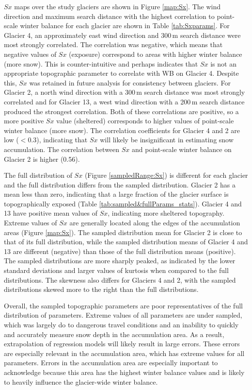 \documentclass{sfuthesis}
\begin{document}
$Sx$ maps over the study glaciers are shown in Figure \ref{map:Sx}. The wind direction and maximum search distance with the highest correlation to point-scale winter balance for each glacier are shown in Table \ref{tab:Sxparams}. For Glacier 4, an approximately east wind direction and 300\,m search distance were most strongly correlated. The correlation was negative, which means that negative values of $Sx$ (exposure) correspond to areas with higher winter balance (more snow). This is counter-intuitive and perhaps indicates that $Sx$ is not an appropriate topographic parameter to correlate with WB on Glacier 4. Despite this, $Sx$ was retained in future analysis for consistency between glaciers. For Glacier 2, a north wind direction with a 300\,m search distance was most strongly correlated and for Glacier 13, a west wind direction with a 200\,m search distance produced the strongest correlation. Both of these correlations are positive, so a more positive $Sx$ value (sheltered) corresponds to higher values of point-scale winter balance (more snow). The correlation coefficients for Glacier 4 and 2 are low ($<$0.3), indicating that $Sx$ will likely be insignificant in estimating snow accumulation. The correlation between $Sx$ and point-scale winter balance on Glacier 2 is higher (0.56). 

The full distribution of $Sx$ (Figure \ref{sampledRange:Sx}) is different for each glacier and the full distribution differs from the sampled distribution. Glacier 2 has a mean less than zero, indicating that a large fraction of the glacier surface is topographically exposed (Table \ref{tab:sampled&fullParams_stats}). Glacier 4 and 13 have positive mean values of $Sx$, indicating more sheltered topography. Extreme values of $Sx$ are generally located along the edges of the accumulation areas (Figure \ref{map:Sx}). The sampled distribution mean for Glacier 2 is close to that of its full distribution, while the sampled distribution means of Glacier 4 and 13 are different (negative) than those of the full distribution means (positive). The sampled distributions are more sharply peaked, as indicated by the lower standard deviations and larger values of kurtosis when compared to the full distributions. The skewness also differs for Glaciers 4 and 2, with the sampled distributions skewed more to the right than the full distributions. 

Overall, the sampled topographic parameters are poor representatives of the full distribution of parameters. Extreme values of all parameters are under sampled, which was largely do to dangerous travel conditions and an inability to quickly and accurately measure snow depth in the accumulation area. As a result, extrapolation of regression models will likely result in large errors. These errors are especially relevant in the accumulation area, which has extreme values for all parameters. Errors in the accumulation area are especially important to acknowledge because this area has the highest winter balance values and is likely to heavily influence the glacier-wide winter balance. 
\end{document}
